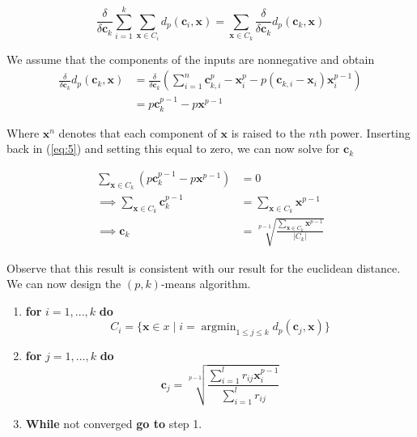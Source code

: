 \documentclass[11pt]{article}
\DeclareMathOperator*{\argmin}{argmin}
\begin{document}
    \begin{equation} \label{eq:5}
        \frac{\delta}{\delta \mathbf{c}_k} \sum_{i=1}^k \sum_{\mathbf{x} \in C_i} d_p (\mathbf{c}_i, \mathbf{x}) = \sum_{\mathbf{x} \in C_k} \frac{\delta}{\delta \mathbf{c}_k} d_p(\mathbf{c}_k, \mathbf{x})
    \end{equation}
    
    We assume that the components of the inputs are nonnegative and obtain
    \begin{equation}
    \begin{split}
        \frac{\delta}{\delta \mathbf{c}_k} d_p(\mathbf{c}_k, \mathbf{x}) &= \frac{\delta}{\delta \mathbf{c}_k} (\sum_{i=1}^n \mathbf{c}_{k,i}^p - \mathbf{x}_i^p - p(\mathbf{c}_{k,i} - \mathbf{x}_i) \mathbf{x}_i^{p-1} )\\
        &= p \mathbf{c}_k^{p-1} - p \mathbf{x}^{p-1}
    \end{split}
    \end{equation}
    
    Where $\mathbf{x}^n$ denotes that each component of $\mathbf{x}$ is raised to the $n$th power. Inserting back in (\ref{eq:5}) and setting this equal to zero, we can now solve for $\mathbf{c}_k$
    
    \begin{equation}
    \begin{split}
        \sum_{\mathbf{x} \in C_k} (p \mathbf{c}_k^{p-1} - p \mathbf{x}^{p-1}) &= 0\\
        \implies \sum_{\mathbf{x} \in C_k} \mathbf{c}_k^{p-1} &= \sum_{\mathbf{x} \in C_k} \mathbf{x}^{p-1}\\
        \implies \mathbf{c}_k &= \sqrt[p-1]{\frac{\sum_{\mathbf{x} \in C_k} \mathbf{x}^{p-1}} {|C_k|}}
    \end{split}
    \end{equation}
    
    Observe that this result is consistent with our result for the euclidean distance. We can now design the $(p, k)$-means algorithm.
    
    \begin{enumerate}
        \item \textbf{for} $i = 1, ..., k$ \textbf{do}
        \begin{equation*}
            C_i = \{ \mathbf{x} \in x \mid i = \argmin_{1 \leq j \leq k} d_p(\mathbf{c}_j, \mathbf{x}) \}
        \end{equation*}
        
        \item \textbf{for} $j = 1, ..., k$ \textbf{do}
        \begin{equation*}
            \mathbf{c}_j = \sqrt[p-1]{\frac{\sum_{i=1}^l r_{ij} \mathbf{x}_i^{p-1}}{\sum_{i=1}^l r_{ij}}}
        \end{equation*}
        
        \item \textbf{While} not converged \textbf{go to} step 1.

    \end{enumerate}
\end{document}
